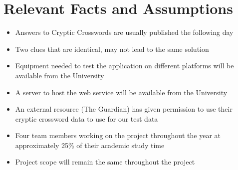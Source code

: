 \section{Relevant Facts and Assumptions}

\begin{itemize}
\item Answers to Cryptic Crosswords are usually published the following day
\item Two clues that are identical, may not lead to the same solution
\item Equipment needed to test the application on different platforms will be
available from the University
\item A server to host the web service will be available from the University
\item An external resource (The Guardian) has given permission to use their cryptic crossword data to use for
our test data
\item Four team members working on the project throughout the year at approximately
25\% of their academic study time
\item Project scope will remain the same throughout the project
\end{itemize}